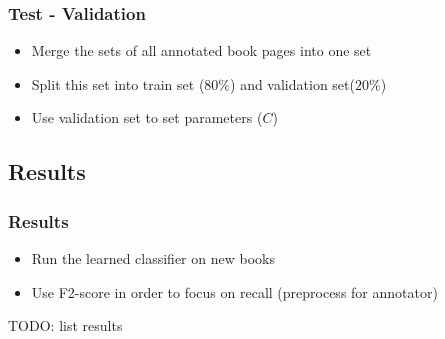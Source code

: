 \begin{frame}
\frametitle{Test - Validation}
\begin{itemize}
\item Merge the sets of all annotated book pages into one set
\item Split this set into train set ($80\%$) and validation set($20\%$)
\item Use validation set to set parameters ($C$)
\end{itemize}


\end{frame}

\subsection{Results}
\begin{frame}
\frametitle{Results}
\begin{itemize}
\item Run the learned classifier on new books
\item Use F2-score in order to focus on recall (preprocess for annotator)
\end{itemize}
TODO: list results

\end{frame}
